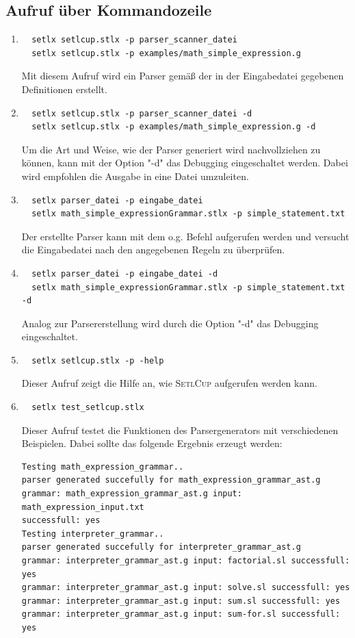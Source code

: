 \subsection{Aufruf über Kommandozeile}
\begin{enumerate}
	\item \begin{Verbatim}
  setlx setlcup.stlx -p parser_scanner_datei
  setlx setlcup.stlx -p examples/math_simple_expression.g
	\end{Verbatim}
			Mit diesem Aufruf wird ein Parser gemäß der in der Eingabedatei gegebenen Definitionen erstellt.
	\item \begin{Verbatim}
  setlx setlcup.stlx -p parser_scanner_datei -d
  setlx setlcup.stlx -p examples/math_simple_expression.g -d
	\end{Verbatim}
			Um die Art und Weise, wie der Parser generiert wird nachvollziehen zu können, kann mit der Option "-d" das Debugging eingeschaltet werden. Dabei wird empfohlen die Ausgabe in eine Datei umzuleiten.
	\item \begin{Verbatim}
  setlx parser_datei -p eingabe_datei
  setlx math_simple_expressionGrammar.stlx -p simple_statement.txt
	\end{Verbatim}
	Der erstellte Parser kann mit dem o.g. Befehl aufgerufen werden und versucht die Eingabedatei nach den angegebenen Regeln zu überprüfen.
		\item \begin{Verbatim}
  setlx parser_datei -p eingabe_datei -d
  setlx math_simple_expressionGrammar.stlx -p simple_statement.txt -d
	\end{Verbatim}
	Analog zur Parsererstellung wird durch die Option "-d" das Debugging eingeschaltet.
	\item \begin{Verbatim}
  setlx setlcup.stlx -p -help
	\end{Verbatim}
			Dieser Aufruf zeigt die Hilfe an, wie \textsc{SetlCup} aufgerufen werden kann.
	\item \begin{Verbatim}
  setlx test_setlcup.stlx
	\end{Verbatim}
			Dieser Aufruf testet die Funktionen des Parsergenerators mit verschiedenen Beispielen. Dabei sollte das folgende Ergebnis erzeugt werden:
\begin{flushleft}
\begin{Verbatim}
Testing math_expression_grammar..
parser generated succefully for math_expression_grammar_ast.g
grammar: math_expression_grammar_ast.g input: math_expression_input.txt 
successfull: yes
Testing interpreter_grammar..
parser generated succefully for interpreter_grammar_ast.g
grammar: interpreter_grammar_ast.g input: factorial.sl successfull: yes
grammar: interpreter_grammar_ast.g input: solve.sl successfull: yes
grammar: interpreter_grammar_ast.g input: sum.sl successfull: yes
grammar: interpreter_grammar_ast.g input: sum-for.sl successfull: yes
\end{Verbatim}
\end{flushleft}
\end{enumerate}
